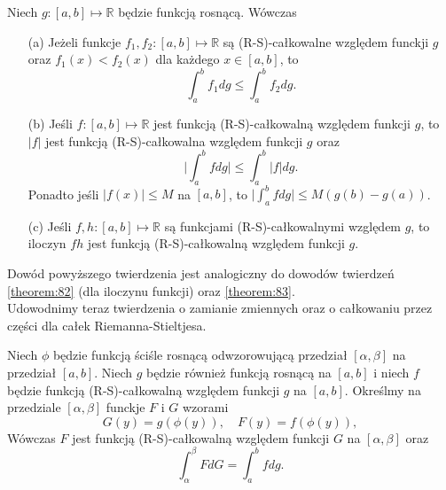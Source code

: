 \documentclass[leqno]{article}
\begin{document}
\begin{justify}
\begin{theorem}
{
    Niech $g : [a,b] \mapsto \mathbb{R}$ będzie funkcją rosnącą. Wówczas
    \begin{itemize}
        \item [(a)]
            Jeżeli funkcje $f_1, f_2 : [a,b] \mapsto \mathbb{R}$ są (R-S)-całkowalne względem funckji $g$ oraz $f_1(x) < f_2(x)$ dla każdego $x \in [a,b]$, to
            \[
                \int_{a}^{b}f_1dg \leqslant \int_{a}^{b}f_2dg.
            \]
        \item [(b)]
            Jeśli $f : [a,b] \mapsto \mathbb{R}$ jest funkcją (R-S)-całkowalną względem funkcji $g$, to $|f|$ jest funkcją (R-S)-całkowalna względem funkcji $g$ oraz
            \[
                \Bigg|\int_{a}^{b}fdg\Bigg| \leqslant \int_{a}^{b}|f|dg.
            \]
            Ponadto jeśli $|f(x)| \leqslant M$ na $[a,b]$, to $\Big|\int_{a}^{b}fdg\Big| \leqslant M(g(b) - g(a))$.
        \item [(c)]
            Jeśli $f,h : [a,b] \mapsto \mathbb{R}$ są funkcjami (R-S)-całkowalnymi względem $g$, to iloczyn $fh$ jest funkcją (R-S)-całkowalną względem funkcji $g$.
    \end{itemize}
}
\end{theorem}

Dowód powyższego twierdzenia jest analogiczny do dowodów twierdzeń \ref{theorem:82} (dla iloczynu funkcji) oraz \ref{theorem:83}. \\
Udowodnimy teraz twierdzenia o zamianie zmiennych oraz o całkowaniu przez części dla całek Riemanna-Stieltjesa.

\begin{theorem}
{
    Niech $\phi$ będzie funkcją ściśle rosnącą odwzorowującą przedział $[\alpha, \beta]$ na przedział $[a,b]$.
    Niech $g$ będzie również funkcją rosnącą na $[a,b]$ i niech $f$ będzie funkcją (R-S)-całkowalną względem funkcji $g$ na $[a,b]$.
    Określmy na przedziale $[\alpha, \beta]$ funckje $F$ i $G$ wzorami
    \[
        G(y) = g(\phi(y)), \quad F(y) = f(\phi(y)),
    \]
    Wówczas $F$ jest funkcją (R-S)-całkowalną względem funkcji $G$ na $[\alpha, \beta]$ oraz
    \[
        \int_{\alpha}^{\beta}FdG = \int_{a}^{b}fdg.
    \]
}
\end{theorem}


\end{justify}
\end{document}
